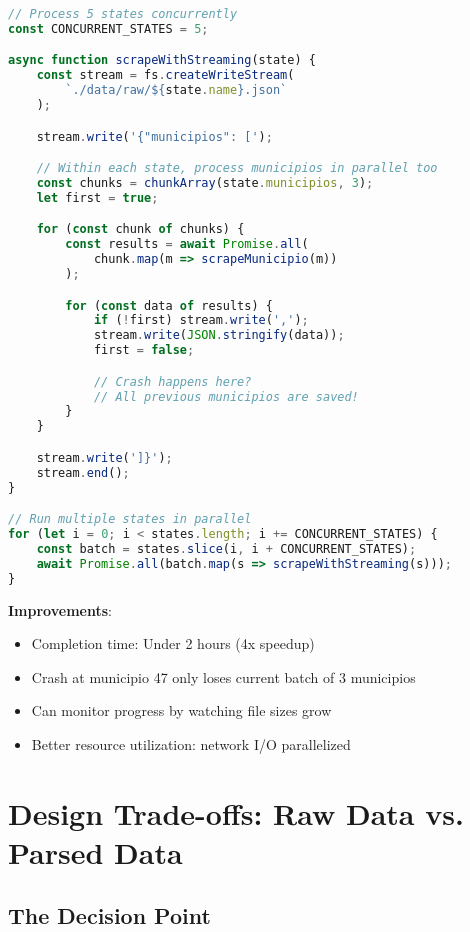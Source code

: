 \documentclass[11pt,a4paper]{article}
\begin{document}
\begin{lstlisting}[language=JavaScript,caption={Improved version}]
// Process 5 states concurrently
const CONCURRENT_STATES = 5;

async function scrapeWithStreaming(state) {
    const stream = fs.createWriteStream(
        `./data/raw/${state.name}.json`
    );

    stream.write('{"municipios": [');

    // Within each state, process municipios in parallel too
    const chunks = chunkArray(state.municipios, 3);
    let first = true;

    for (const chunk of chunks) {
        const results = await Promise.all(
            chunk.map(m => scrapeMunicipio(m))
        );

        for (const data of results) {
            if (!first) stream.write(',');
            stream.write(JSON.stringify(data));
            first = false;

            // Crash happens here?
            // All previous municipios are saved!
        }
    }

    stream.write(']}');
    stream.end();
}

// Run multiple states in parallel
for (let i = 0; i < states.length; i += CONCURRENT_STATES) {
    const batch = states.slice(i, i + CONCURRENT_STATES);
    await Promise.all(batch.map(s => scrapeWithStreaming(s)));
}
\end{lstlisting}

\textbf{Improvements}:
\begin{itemize}
    \item Completion time: Under 2 hours (4x speedup)
    \item Crash at municipio 47 only loses current batch of 3 municipios
    \item Can monitor progress by watching file sizes grow
    \item Better resource utilization: network I/O parallelized
\end{itemize}

\section{Design Trade-offs: Raw Data vs. Parsed Data}

\subsection{The Decision Point}
\end{document}
